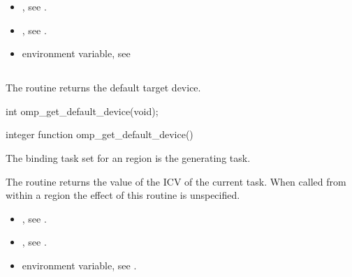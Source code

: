 \crossreferences
\begin{itemize}
\item {}, see 
.

\item {}, see 
.

\item {} environment variable, see 
\end{itemize}










\subsection{}
\label{subsec:omp_get_default_device}
\summary
The  routine returns the default target device.

\format
\begin{ccppspecific}
\begin{boxedcode}
int omp\_get\_default\_device(void);
\end{boxedcode}
\end{ccppspecific}

\begin{fortranspecific}
\begin{boxedcode}
integer function omp\_get\_default\_device()
\end{boxedcode}
\end{fortranspecific}

\binding
The binding task set for an  region is the generating 
task. 

\effect
The  routine returns the value of the  
ICV of the current task. When called from within a  region the effect of this 
routine is unspecified.

\crossreferences
\begin{itemize}
\item {}, see 
.

\item {}, see 
.

\item {} environment variable, see 
. 
\end{itemize}












